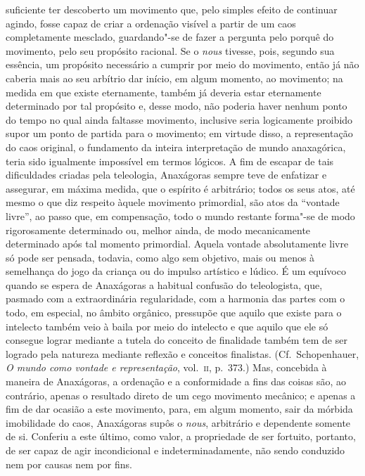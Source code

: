  suficiente ter descoberto um movimento que, pelo simples efeito de continuar
 agindo, fosse capaz de criar a ordenação visível a partir de um caos
 completamente mesclado, guardando"-se de fazer a pergunta pelo porquê do
 movimento, pelo seu propósito racional. Se o \textit{nous} tivesse, pois,
 segundo sua essência, um propósito necessário a cumprir por meio do
 movimento, então já não caberia mais ao seu arbítrio dar início, em algum
 momento, ao movimento; na medida em que existe eternamente, também já
 deveria estar eternamente determinado por tal propósito e, desse modo, não
 poderia haver nenhum ponto do tempo no qual ainda faltasse movimento,
 inclusive seria logicamente proibido supor um ponto de partida para o
 movimento; em virtude disso, a representação do caos original, o fundamento
 da inteira interpretação de mundo anaxagórica, teria sido igualmente
 impossível em termos lógicos. A fim de escapar de tais dificuldades criadas
 pela teleologia, Anaxágoras sempre teve de enfatizar e assegurar, em máxima
 medida, que o espírito é arbitrário; todos os seus atos, até mesmo o que diz
 respeito àquele movimento primordial, são atos da ``vontade livre'', ao
 passo que, em compensação, todo o mundo restante forma"-se de modo
 rigorosamente determinado ou, melhor ainda, de modo mecanicamente
 determinado após tal momento primordial. Aquela vontade absolutamente livre
 só pode ser pensada, todavia, como algo sem objetivo, mais ou menos à
 semelhança do jogo da criança ou do impulso artístico e lúdico. É um
 equívoco quando se espera de Anaxágoras a habitual confusão do teleologista,
 que, pasmado com a extraordinária regularidade, com a harmonia das partes
 com o todo, em especial, no âmbito orgânico, pressupõe que aquilo que existe
 para o intelecto também veio à baila por meio do intelecto e que aquilo que
 ele só consegue lograr mediante a tutela do conceito de finalidade também
 tem de ser logrado pela natureza mediante reflexão e conceitos finalistas.
 (Cf.~Schopenhauer, \textit{O mundo como vontade e representação}, vol.~\textsc{ii}, 
 p.~373.) Mas, concebida à maneira de Anaxágoras, a ordenação e a conformidade a fins das
 coisas são, ao contrário, apenas o resultado direto de um cego movimento
 mecânico; e apenas a fim de dar ocasião a este movimento, para, em algum
 momento, sair da mórbida imobilidade do caos, Anaxágoras supôs o \textit{nous}, arbitrário e dependente somente de si. Conferiu a este último, como
 valor, a propriedade de ser fortuito, portanto, de ser capaz de agir
 incondicional e indeterminadamente, não sendo conduzido nem por causas nem
 por fins.


